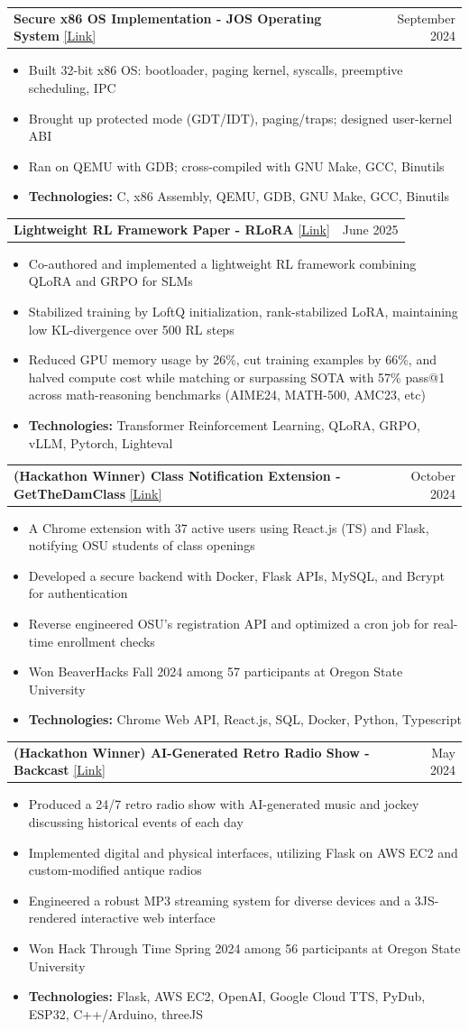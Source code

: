 \documentclass[letterpaper,11pt]{article}
\makeatletter
\newcommand{\resumeItem}[1]{
\item\small{
    {#1 \vspace{-2pt}}
  }
}
\newcommand{\resumeProjectHeading}[2]{
\item
  \begin{tabular*}{0.97\textwidth}{l@{\extracolsep{\fill}}r}
    \small#1 & #2 \\
  \end{tabular*}\vspace{-7pt}
}
\newcommand{\resumeItemListStart}{
\begin{itemize}}
\newcommand{\resumeItemListEnd}{
\end{itemize}\vspace{-5pt}}
\makeatother
\begin{document}
\resumeProjectHeading
{\textbf{Secure x86 OS Implementation - JOS Operating System} \href{https://github.com/aj-arts/jos-operating-system-implementation}{[Link]}}{September 2024}
\resumeItemListStart
\resumeItem{Built 32-bit x86 OS: bootloader, paging kernel, syscalls, preemptive scheduling, IPC}
\resumeItem{Brought up protected mode (GDT/IDT), paging/traps; designed user-kernel ABI}
\resumeItem{Ran on QEMU with GDB; cross-compiled with GNU Make, GCC, Binutils}
\resumeItem{\textbf{Technologies:} C, x86 Assembly, QEMU, GDB, GNU Make, GCC, Binutils}
\resumeItemListEnd

\resumeProjectHeading
{\textbf{Lightweight RL Framework Paper - RLoRA} \href{https://tinyurl.com/rlorafullpaper}{[Link]}}{June 2025}
\resumeItemListStart
\resumeItem{Co-authored and implemented a lightweight RL framework combining QLoRA and GRPO for SLMs}
\resumeItem{Stabilized training by LoftQ initialization, rank-stabilized LoRA, maintaining low KL-divergence over 500 RL steps}
\resumeItem{Reduced GPU memory usage by 26\%, cut training examples by 66\%, and halved compute cost while matching or surpassing SOTA with 57\% pass@1 across math-reasoning benchmarks (AIME24, MATH-500, AMC23, etc)}
\resumeItem{\textbf{Technologies:} Transformer Reinforcement Learning, QLoRA, GRPO, vLLM, Pytorch, Lighteval}
\resumeItemListEnd

\resumeProjectHeading
{\textbf{(Hackathon Winner) Class Notification Extension - GetTheDamClass} \href{https://devpost.com/software/getthedamclass}{[Link]}}{October 2024}
\resumeItemListStart
\resumeItem{A Chrome extension with 37 active users using React.js (TS) and Flask, notifying OSU students of class openings}
\resumeItem{Developed a secure backend with Docker, Flask APIs, MySQL, and Bcrypt for authentication}
\resumeItem{Reverse engineered OSU's registration API and optimized a cron job for real-time enrollment checks}
\resumeItem{Won BeaverHacks Fall 2024 among 57 participants at Oregon State University}
\resumeItem{\textbf{Technologies:} Chrome Web API, React.js, SQL, Docker, Python, Typescript}
\resumeItemListEnd

\resumeProjectHeading
{\textbf{(Hackathon Winner) AI-Generated Retro Radio Show - Backcast} \href{https://devpost.com/software/timeless-w1ze62}{[Link]}}{May 2024}
\resumeItemListStart
\resumeItem{Produced a 24/7 retro radio show with AI-generated music and jockey discussing historical events of each day}
\resumeItem{Implemented digital and physical interfaces, utilizing Flask on AWS EC2 and custom-modified antique radios}
\resumeItem{Engineered a robust MP3 streaming system for diverse devices and a 3JS-rendered interactive web interface}
\resumeItem{Won Hack Through Time Spring 2024 among 56 participants at Oregon State University}
\resumeItem{\textbf{Technologies:} Flask, AWS EC2, OpenAI, Google Cloud TTS, PyDub, ESP32, C++/Arduino, threeJS}
\resumeItemListEnd
\end{document}
